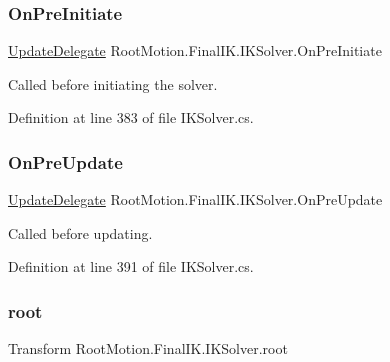 \subsubsection{\texorpdfstring{On\+Pre\+Initiate}{OnPreInitiate}}
{\footnotesize\ttfamily \mbox{\hyperlink{class_root_motion_1_1_final_i_k_1_1_i_k_solver_a237d83c7b9c6eace8a21aa5821f0a671}{Update\+Delegate}} Root\+Motion.\+Final\+I\+K.\+I\+K\+Solver.\+On\+Pre\+Initiate}



Called before initiating the solver. 



Definition at line 383 of file I\+K\+Solver.\+cs.

\mbox{\label{class_root_motion_1_1_final_i_k_1_1_i_k_solver_a509211f13d94e4a89be7e539c465e55a}} 
\subsubsection{\texorpdfstring{On\+Pre\+Update}{OnPreUpdate}}
{\footnotesize\ttfamily \mbox{\hyperlink{class_root_motion_1_1_final_i_k_1_1_i_k_solver_a237d83c7b9c6eace8a21aa5821f0a671}{Update\+Delegate}} Root\+Motion.\+Final\+I\+K.\+I\+K\+Solver.\+On\+Pre\+Update}



Called before updating. 



Definition at line 391 of file I\+K\+Solver.\+cs.

\mbox{\label{class_root_motion_1_1_final_i_k_1_1_i_k_solver_add558b38f163259934c37a0f1b497c06}} 
\subsubsection{\texorpdfstring{root}{root}}
{\footnotesize\ttfamily Transform Root\+Motion.\+Final\+I\+K.\+I\+K\+Solver.\+root\hspace{0.3cm}{\ttfamily [protected]}}



